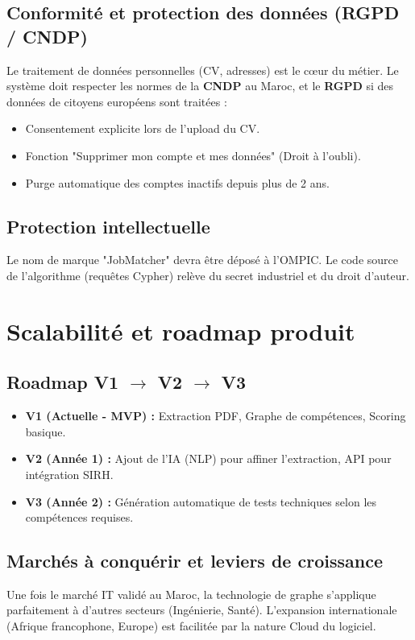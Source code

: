\documentclass[12pt,a4paper]{report}
\begin{document}
\begin{itemize}
\subsection{Conformité et protection des données (RGPD / CNDP)}
Le traitement de données personnelles (CV, adresses) est le cœur du métier. Le système doit respecter les normes de la \textbf{CNDP} au Maroc, et le \textbf{RGPD} si des données de citoyens européens sont traitées :
\begin{itemize}
    \item Consentement explicite lors de l'upload du CV.
    \item Fonction "Supprimer mon compte et mes données" (Droit à l'oubli).
    \item Purge automatique des comptes inactifs depuis plus de 2 ans.
\end{itemize}

\subsection{Protection intellectuelle}
Le nom de marque "JobMatcher" devra être déposé à l'OMPIC. Le code source de l'algorithme (requêtes Cypher) relève du secret industriel et du droit d'auteur.

\section{Scalabilité et roadmap produit}

\subsection{Roadmap V1 $\rightarrow$ V2 $\rightarrow$ V3}
\begin{itemize}
    \item \textbf{V1 (Actuelle - MVP) :} Extraction PDF, Graphe de compétences, Scoring basique.
    \item \textbf{V2 (Année 1) :} Ajout de l'IA (NLP) pour affiner l'extraction, API pour intégration SIRH.
    \item \textbf{V3 (Année 2) :} Génération automatique de tests techniques selon les compétences requises.
\end{itemize}

\subsection{Marchés à conquérir et leviers de croissance}
Une fois le marché IT validé au Maroc, la technologie de graphe s'applique parfaitement à d'autres secteurs (Ingénierie, Santé). L'expansion internationale (Afrique francophone, Europe) est facilitée par la nature Cloud du logiciel.


\end{itemize}
\end{document}
